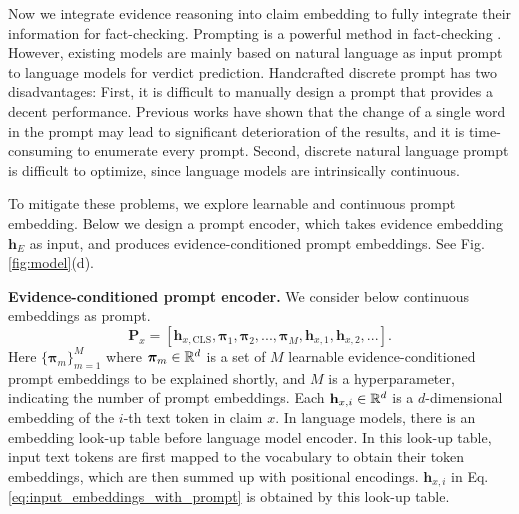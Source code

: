 Now we integrate evidence reasoning into claim embedding to fully integrate their information for fact-checking. Prompting \cite{p_tuning} is a powerful method in fact-checking \cite{protoco}. However, existing models are mainly based on natural language as input prompt to language models for verdict prediction. Handcrafted discrete prompt has two disadvantages: First, it is difficult to manually design a prompt that provides a decent performance. Previous works \cite{coop} have shown that the change of a single word in the prompt may lead to significant deterioration of the results, and it is time-consuming to enumerate every prompt. Second, discrete natural language prompt is difficult to optimize, since language models are intrinsically continuous.

To mitigate these problems, we explore learnable and continuous prompt embedding. Below we design a prompt encoder, which takes evidence embedding $ \textbf{h}_E $ as input, and produces evidence-conditioned prompt embeddings. See Fig. \ref{fig:model}(d).

\textbf{Evidence-conditioned prompt encoder.} We consider below continuous embeddings as prompt.
\begin{equation}
\label{eq:input_embeddings_with_prompt}
    \textbf{P}_x=[\textbf{h}_{x,\text{CLS}},\bm{\pi}_1,\bm{\pi}_2,...,\bm{\pi}_M,\textbf{h}_{x,1},\textbf{h}_{x,2},...].
\end{equation}
Here $ \{\bm{\pi}_m\}_{m=1}^M $ where $ \bm{\pi}_m\in\Bbb R^d $ is a set of $ M $ learnable evidence-conditioned prompt embeddings to be explained shortly, and $ M $ is a hyperparameter, indicating the number of prompt embeddings. Each $ \textbf{h}_{x,i}\in\Bbb R^d $ is a $ d $-dimensional embedding of the $ i $-th text token in claim $ x $. In language models, there is an embedding look-up table before language model encoder. In this look-up table, input text tokens are first mapped to the vocabulary to obtain their token embeddings, which are then summed up with positional encodings. $ \textbf{h}_{x,i} $ in Eq. \ref{eq:input_embeddings_with_prompt} is obtained by this look-up table.


